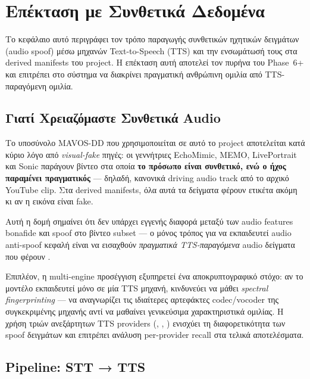 \chapter{Επέκταση με Συνθετικά Δεδομένα}

Το κεφάλαιο αυτό περιγράφει τον τρόπο παραγωγής συνθετικών ηχητικών
δειγμάτων (audio spoof) μέσω μηχανών Text-to-Speech (TTS) και την ενσωμάτωσή
τους στα derived manifests του project.
Η επέκταση αυτή αποτελεί τον πυρήνα του Phase~6+ και επιτρέπει στο σύστημα
να διακρίνει πραγματική ανθρώπινη ομιλία από TTS-παραγόμενη ομιλία.

\section{Γιατί Χρειαζόμαστε Συνθετικά Audio}
\label{sec:why-tts}

Το υποσύνολο MAVOS-DD που χρησιμοποιείται σε αυτό το project αποτελείται
κατά κύριο λόγο από \emph{visual-fake} πηγές: οι γεννήτριες EchoMimic,
MEMO, LivePortrait και Sonic παράγουν βίντεο στα οποία \textbf{το πρόσωπο
είναι συνθετικό, ενώ ο ήχος παραμένει πραγματικός} — δηλαδή, κανονικά
driving audio track από το αρχικό YouTube clip.
Στα derived manifests, όλα αυτά τα δείγματα φέρουν ετικέτα
 ακόμη κι αν η εικόνα είναι fake.

Αυτή η δομή σημαίνει ότι δεν υπάρχει εγγενής διαφορά μεταξύ των
audio features bonafide και spoof στο βίντεο subset — ο μόνος τρόπος
για να εκπαιδευτεί audio anti-spoof κεφαλή είναι να εισαχθούν
\emph{πραγματικά TTS-παραγόμενα} audio δείγματα που φέρουν
.

Επιπλέον, η multi-engine προσέγγιση εξυπηρετεί ένα αποκρυπτογραφικό
στόχο: αν το μοντέλο εκπαιδευτεί μόνο σε μία TTS μηχανή, κινδυνεύει
να μάθει \emph{spectral fingerprinting} — να αναγνωρίζει τις ιδιαίτερες
αρτεφάκτες codec/vocoder της συγκεκριμένης μηχανής αντί να μαθαίνει
γενικεύσιμα χαρακτηριστικά ομιλίας.
Η χρήση τριών ανεξάρτητων TTS providers (,
, ) ενισχύει τη
διαφορετικότητα των spoof δειγμάτων και επιτρέπει ανάλυση per-provider
recall στα τελικά αποτελέσματα.

\section{Pipeline: STT → TTS}
\label{sec:stt-tts-pipeline}

